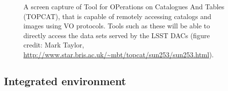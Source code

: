 \documentclass[DM,lsstdraft,toc]{lsstdoc}
\begin{document}
\begin{figure}
	\centering
	\caption{A screen capture of Tool for OPerations on Catalogues And Tables (TOPCAT), that is capable of remotely accessing catalogs and images using VO protocols. Tools such as these will be able to directly access the data sets served by the LSST DACs (figure credit: Mark Taylor, \url{http://www.star.bris.ac.uk/~mbt/topcat/sun253/sun253.html}).
		\label{fig:toolsTOPCAT}}
\end{figure}

\subsection{Integrated environment}
\end{document}
